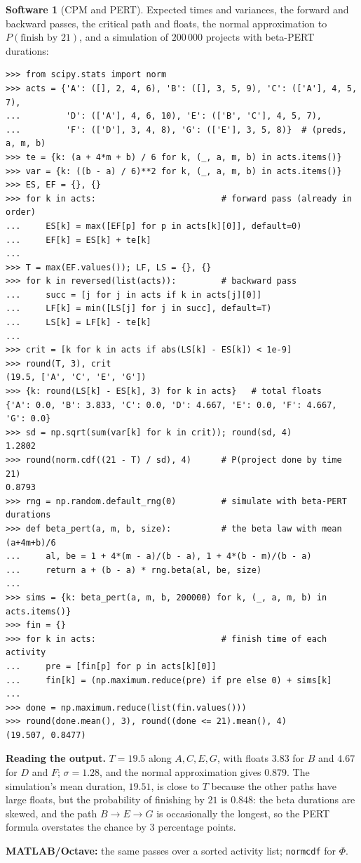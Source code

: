 \documentclass[11pt,a4paper]{article}
\numberwithin{equation}{section}
\theoremstyle{definition}
\newtheorem{software}[thm]{Software}
\begin{document}
\begin{software}[CPM and PERT]
\label{sw:pert}
Expected times and variances, the forward and backward passes, the critical path and floats, the normal approximation to $P(\text{finish by } 21)$, and a simulation of $200\,000$ projects with beta-PERT durations:
{\small\begin{verbatim}
>>> from scipy.stats import norm
>>> acts = {'A': ([], 2, 4, 6), 'B': ([], 3, 5, 9), 'C': (['A'], 4, 5, 7),
...         'D': (['A'], 4, 6, 10), 'E': (['B', 'C'], 4, 5, 7),
...         'F': (['D'], 3, 4, 8), 'G': (['E'], 3, 5, 8)}  # (preds, a, m, b)
>>> te = {k: (a + 4*m + b) / 6 for k, (_, a, m, b) in acts.items()}
>>> var = {k: ((b - a) / 6)**2 for k, (_, a, m, b) in acts.items()}
>>> ES, EF = {}, {}
>>> for k in acts:                         # forward pass (already in order)
...     ES[k] = max([EF[p] for p in acts[k][0]], default=0)
...     EF[k] = ES[k] + te[k]
...
>>> T = max(EF.values()); LF, LS = {}, {}
>>> for k in reversed(list(acts)):         # backward pass
...     succ = [j for j in acts if k in acts[j][0]]
...     LF[k] = min([LS[j] for j in succ], default=T)
...     LS[k] = LF[k] - te[k]
...
>>> crit = [k for k in acts if abs(LS[k] - ES[k]) < 1e-9]
>>> round(T, 3), crit
(19.5, ['A', 'C', 'E', 'G'])
>>> {k: round(LS[k] - ES[k], 3) for k in acts}   # total floats
{'A': 0.0, 'B': 3.833, 'C': 0.0, 'D': 4.667, 'E': 0.0, 'F': 4.667, 'G': 0.0}
>>> sd = np.sqrt(sum(var[k] for k in crit)); round(sd, 4)
1.2802
>>> round(norm.cdf((21 - T) / sd), 4)      # P(project done by time 21)
0.8793
>>> rng = np.random.default_rng(0)         # simulate with beta-PERT durations
>>> def beta_pert(a, m, b, size):          # the beta law with mean (a+4m+b)/6
...     al, be = 1 + 4*(m - a)/(b - a), 1 + 4*(b - m)/(b - a)
...     return a + (b - a) * rng.beta(al, be, size)
...
>>> sims = {k: beta_pert(a, m, b, 200000) for k, (_, a, m, b) in acts.items()}
>>> fin = {}
>>> for k in acts:                         # finish time of each activity
...     pre = [fin[p] for p in acts[k][0]]
...     fin[k] = (np.maximum.reduce(pre) if pre else 0) + sims[k]
...
>>> done = np.maximum.reduce(list(fin.values()))
>>> round(done.mean(), 3), round((done <= 21).mean(), 4)
(19.507, 0.8477)
\end{verbatim}}
\textbf{Reading the output.} $T = 19.5$ along $A, C, E, G$, with floats $3.83$ for $B$ and $4.67$ for $D$ and $F$; $\sigma = 1.28$, and the normal approximation gives $0.879$. The simulation's mean duration, $19.51$, is close to $T$ because the other paths have large floats, but the probability of finishing by $21$ is
$0.848$: the beta durations are skewed, and the path $B \to E \to G$ is occasionally the longest, so the PERT formula overstates the chance by $3$ percentage points.

\textbf{MATLAB/Octave:} the same passes over a sorted activity list; \texttt{normcdf} for $\Phi$.
\end{software}
\end{document}
